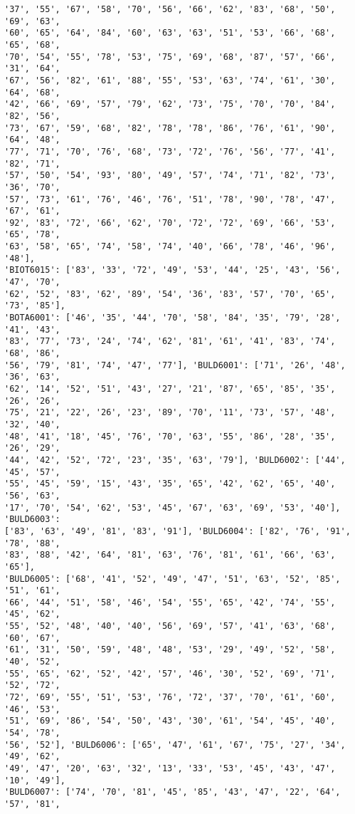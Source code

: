 \documentclass[11pt]{article}
\begin{document}
\begin{Verbatim}[commandchars=\\\{\}]
'37', '55', '67', '58', '70', '56', '66', '62', '83', '68', '50', '69', '63',
'60', '65', '64', '84', '60', '63', '63', '51', '53', '66', '68', '65', '68',
'70', '54', '55', '78', '53', '75', '69', '68', '87', '57', '66', '31', '64',
'67', '56', '82', '61', '88', '55', '53', '63', '74', '61', '30', '64', '68',
'42', '66', '69', '57', '79', '62', '73', '75', '70', '70', '84', '82', '56',
'73', '67', '59', '68', '82', '78', '78', '86', '76', '61', '90', '64', '48',
'77', '71', '70', '76', '68', '73', '72', '76', '56', '77', '41', '82', '71',
'57', '50', '54', '93', '80', '49', '57', '74', '71', '82', '73', '36', '70',
'57', '73', '61', '76', '46', '76', '51', '78', '90', '78', '47', '67', '61',
'92', '83', '72', '66', '62', '70', '72', '72', '69', '66', '53', '65', '78',
'63', '58', '65', '74', '58', '74', '40', '66', '78', '46', '96', '48'],
'BIOT6015': ['83', '33', '72', '49', '53', '44', '25', '43', '56', '47', '70',
'62', '52', '83', '62', '89', '54', '36', '83', '57', '70', '65', '73', '85'],
'BOTA6001': ['46', '35', '44', '70', '58', '84', '35', '79', '28', '41', '43',
'83', '77', '73', '24', '74', '62', '81', '61', '41', '83', '74', '68', '86',
'56', '79', '81', '74', '47', '77'], 'BULD6001': ['71', '26', '48', '36', '63',
'62', '14', '52', '51', '43', '27', '21', '87', '65', '85', '35', '26', '26',
'75', '21', '22', '26', '23', '89', '70', '11', '73', '57', '48', '32', '40',
'48', '41', '18', '45', '76', '70', '63', '55', '86', '28', '35', '26', '29',
'44', '42', '52', '72', '23', '35', '63', '79'], 'BULD6002': ['44', '45', '57',
'55', '45', '59', '15', '43', '35', '65', '42', '62', '65', '40', '56', '63',
'17', '70', '54', '62', '53', '45', '67', '63', '69', '53', '40'], 'BULD6003':
['83', '63', '49', '81', '83', '91'], 'BULD6004': ['82', '76', '91', '78', '88',
'83', '88', '42', '64', '81', '63', '76', '81', '61', '66', '63', '65'],
'BULD6005': ['68', '41', '52', '49', '47', '51', '63', '52', '85', '51', '61',
'66', '44', '51', '58', '46', '54', '55', '65', '42', '74', '55', '45', '62',
'55', '52', '48', '40', '40', '56', '69', '57', '41', '63', '68', '60', '67',
'61', '31', '50', '59', '48', '48', '53', '29', '49', '52', '58', '40', '52',
'55', '65', '62', '52', '42', '57', '46', '30', '52', '69', '71', '52', '72',
'72', '69', '55', '51', '53', '76', '72', '37', '70', '61', '60', '46', '53',
'51', '69', '86', '54', '50', '43', '30', '61', '54', '45', '40', '54', '78',
'56', '52'], 'BULD6006': ['65', '47', '61', '67', '75', '27', '34', '49', '62',
'49', '47', '20', '63', '32', '13', '33', '53', '45', '43', '47', '10', '49'],
'BULD6007': ['74', '70', '81', '45', '85', '43', '47', '22', '64', '57', '81',

\end{Verbatim}
\end{document}
